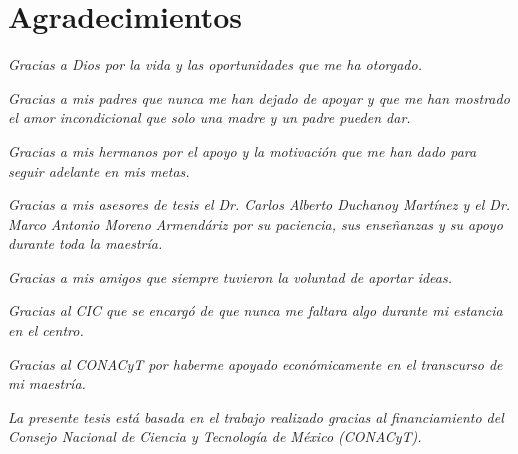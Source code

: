 \chapter*{Agradecimientos}
\vspace{2.4cm}
\begin{flushright}
\emph{Gracias a Dios por la vida y las oportunidades que me ha otorgado.}
\end{flushright}
\begin{flushright}
\emph{Gracias a mis padres que nunca me han dejado de apoyar y que me han mostrado el amor incondicional que solo una madre y un padre pueden dar.}
\end{flushright}
\begin{flushright}
\emph{Gracias a mis hermanos por el apoyo y la motivación que me han dado para seguir adelante en mis metas.}
\end{flushright}
\begin{flushright}
\emph{Gracias a mis asesores de tesis el Dr. Carlos Alberto Duchanoy Martínez y el Dr. Marco Antonio Moreno Armendáriz por su paciencia, sus enseñanzas y su apoyo durante toda la maestría.}
\end{flushright}
\begin{flushright}
\emph{Gracias a mis amigos que siempre tuvieron la voluntad de aportar ideas.}
\end{flushright}
\begin{flushright}
\emph{Gracias al CIC que se encargó de que nunca me faltara algo durante mi estancia en el centro.}
\end{flushright}
\begin{flushright}
\emph{Gracias al CONACyT por haberme apoyado económicamente en el transcurso de mi maestría.}
\end{flushright}

\vspace{7.4cm}

\noindent \emph{La presente tesis está basada en el trabajo realizado gracias al financiamiento del Consejo Nacional de Ciencia y Tecnología de México (CONACyT).}
